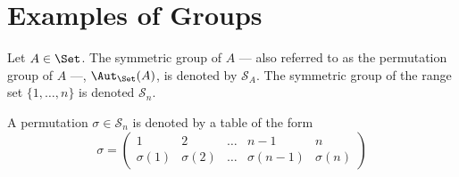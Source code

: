 \section{Examples of Groups}

\begin{definition}\label{def: sym-group}
  Let \(A \in \Set\). The symmetric group of \(A\) --- also referred to as the
  permutation group of \(A\) ---, \(\Aut_\Set(A)\), is denoted by \(\mathcal
  S_A\). The symmetric group of the range set \(\{1, \dots, n\}\) is denoted
  \(\mathcal S_n\).
\end{definition}

\begin{notation}[Permutations]
  A permutation \(\sigma \in \mathcal S_n\) is denoted by a table of the form
  \[
    \sigma =
    \begin{pmatrix}
      1 &2 &\dots &n-1 &n \\
      \sigma(1) &\sigma(2) &\dots &\sigma(n-1) &\sigma(n)
    \end{pmatrix}
  \]
\end{notation}
